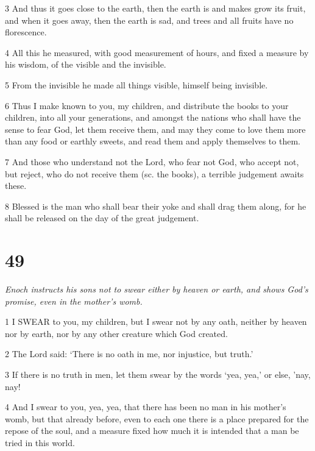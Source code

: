 \par 3 And thus it goes close to the earth, then the earth is and makes grow its fruit, and when it goes away, then the earth is sad, and trees and all fruits have no florescence.

\par 4 All this he measured, with good measurement of hours, and fixed a measure by his wisdom, of the visible and the invisible.

\par 5 From the invisible he made all things visible, himself being invisible.

\par 6 Thus I make known to you, my children, and distribute the books to your children, into all your generations, and amongst the nations who shall have the sense to fear God, let them receive them, and may they come to love them more than any food or earthly sweets, and read them and apply themselves to them.

\par 7 And those who understand not the Lord, who fear not God, who accept not, but reject, who do not receive them (sc. the books), a terrible judgement awaits these.

\par 8 Blessed is the man who shall bear their yoke and shall drag them along, for he shall be released on the day of the great judgement.

\chapter{49}

\par \textit{Enoch instructs his sons not to swear either by heaven or earth, and shows God's promise, even in the mother's womb.}

\par 1 I SWEAR to you, my children, but I swear not by any oath, neither by heaven nor by earth, nor by any other creature which God created.

\par 2 The Lord said: ‘There is no oath in me, nor injustice, but truth.’

\par 3 If there is no truth in men, let them swear by the words ‘yea, yea,’ or else, 'nay, nay!

\par 4 And I swear to you, yea, yea, that there has been no man in his mother's womb, but that already before, even to each one there is a place prepared for the repose of the soul, and a measure fixed how much it is intended that a man be tried in this world.

